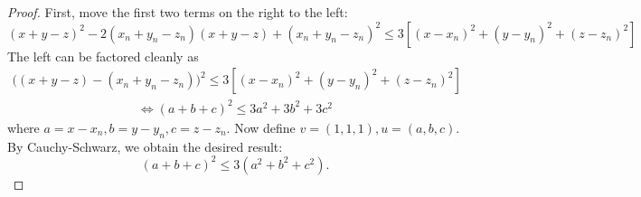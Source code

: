 \begin{proof}
First, move the first two terms on the right to the left: 
$$(x + y - z)^2 - 2(x_n + y_n-z_n)(x+y-z) + (x_n + y_n - z_n)^2 \leq 3[(x-x_n)^2 + (y-y_n)^2 + (z-z_n)^2]$$
The left can be factored cleanly as
\begin{align*}
\big( (x + y - z) - (x_n + y_n - z_n)\big)^2 \leq 3[(x-x_n)^2 + (y-y_n)^2 + (z-z_n)^2]
\end{align*}
\begin{align*}
\iff (a + b + c)^2 \leq 3a^2 + 3b^2 + 3c^2
\end{align*}
where $a = x - x_n, b = y - y_n, c = z - z_n.$ Now define $v = (1, 1, 1), u = (a, b, c).$ By Cauchy-Schwarz, we obtain the desired result:
$$(a + b + c)^2 \leq 3 (a^2 + b^2 + c^2).$$
\end{proof}
